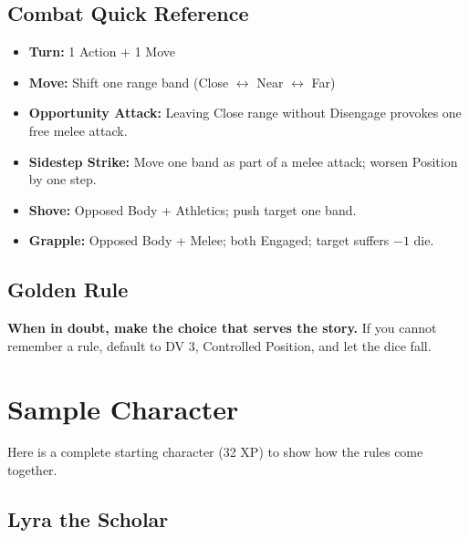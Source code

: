 \documentclass[10pt]{article}
\begin{document}
\subsection*{Combat Quick Reference}

\begin{itemize}
\item \textbf{Turn:} 1 Action + 1 Move
\item \textbf{Move:} Shift one range band (Close $\leftrightarrow$ Near $\leftrightarrow$ Far)
\item \textbf{Opportunity Attack:} Leaving Close range without Disengage provokes one free melee attack.
\item \textbf{Sidestep Strike:} Move one band as part of a melee attack; worsen Position by one step.
\item \textbf{Shove:} Opposed Body + Athletics; push target one band.
\item \textbf{Grapple:} Opposed Body + Melee; both Engaged; target suffers $-1$ die.
\end{itemize}

\subsection*{Golden Rule}

\begin{tipbox}
\textbf{When in doubt, make the choice that serves the story.} If you cannot remember a rule, default to DV 3, Controlled Position, and let the dice fall.
\end{tipbox}

\newpage

\section*{Sample Character}

Here is a complete starting character (32 XP) to show how the rules come together.

\subsection*{Lyra the Scholar}
\end{document}
